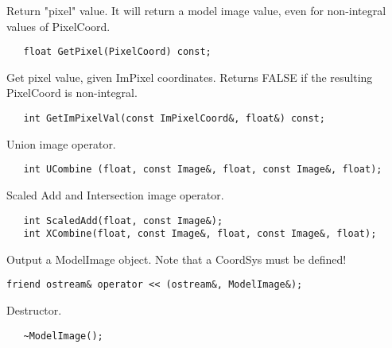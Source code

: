       Return "pixel" value. It will return a model image value, even for
      non-integral values of PixelCoord.
\begin{verbatim}
   float GetPixel(PixelCoord) const;
\end{verbatim}

      Get pixel value, given ImPixel coordinates. Returns FALSE if the 
      resulting PixelCoord is non-integral.
\begin{verbatim}
   int GetImPixelVal(const ImPixelCoord&, float&) const;
\end{verbatim}

      Union image operator.
\begin{verbatim}
   int UCombine (float, const Image&, float, const Image&, float);
\end{verbatim}

      Scaled Add and Intersection image operator.
\begin{verbatim}
   int ScaledAdd(float, const Image&);
   int XCombine(float, const Image&, float, const Image&, float);
\end{verbatim}

      Output a ModelImage object. Note that a CoordSys must be defined!
\begin{verbatim}
friend ostream& operator << (ostream&, ModelImage&);
\end{verbatim}

      Destructor.
\begin{verbatim}
   ~ModelImage();
\end{verbatim}



